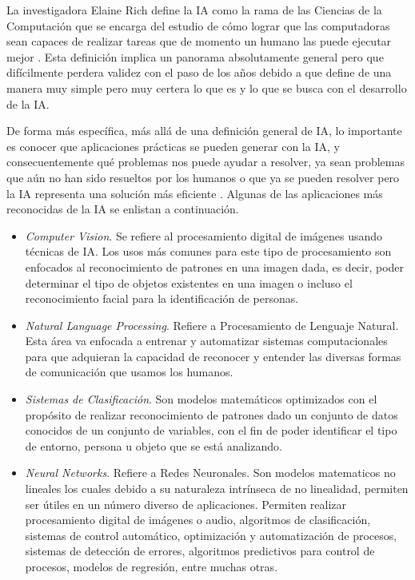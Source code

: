 La investigadora Elaine Rich define la IA como la rama de las Ciencias de la Computación que se encarga del estudio de cómo lograr que las computadoras sean capaces de realizar tareas que de momento un humano las puede ejecutar 
mejor \cite{ElaineRichIA}. Esta definición implica un panorama absolutamente general pero que difícilmente perdera validez con el paso de los años debido a que define de una manera muy simple pero muy certera lo que es y lo 
que se busca con el desarrollo de la IA.

De forma más específica, más allá de una definición general de IA, lo importante es conocer que aplicaciones prácticas se pueden generar con la IA, y consecuentemente qué problemas nos puede ayudar a resolver, ya sean problemas 
que aún no han sido resueltos por los humanos o que ya se pueden resolver pero la IA representa una solución más eficiente \cite{ertel}. Algunas de las aplicaciones más reconocidas de la IA se enlistan a continuación.

\begin{itemize}
    \item \textit{Computer Vision}. Se refiere al procesamiento digital de imágenes usando técnicas de IA. Los usos más comunes para este tipo de procesamiento son enfocados al reconocimiento de patrones en una imagen dada, 
    es decir, poder determinar el tipo de objetos existentes en una imagen o incluso el reconocimiento facial para la identificación de personas. 
    \item \textit{Natural Language Processing}. Refiere a Procesamiento de Lenguaje Natural. Esta área va enfocada a entrenar y automatizar sistemas computacionales para que adquieran la capacidad de reconocer y entender las 
    diversas formas de comunicación que usamos los humanos.
    \item \textit{Sistemas de Clasificación}. Son modelos matemáticos optimizados con el propósito de realizar reconocimiento de patrones dado un conjunto de datos conocidos de un conjunto de variables, con el fin de poder 
    identificar el tipo de entorno, persona u objeto que se está analizando.
    \item \textit{Neural Networks}. Refiere a Redes Neuronales. Son modelos matematicos no lineales los cuales debido a su naturaleza intrínseca de no linealidad, permiten ser útiles en un número diverso de aplicaciones.
    Permiten realizar procesamiento digital de imágenes o audio, algoritmos de clasificación, sistemas de control automático, optimización y automatización de procesos, sistemas de detección de errores, algoritmos predictivos 
    para control de procesos, modelos de regresión, entre muchas otras.   
\end{itemize}

